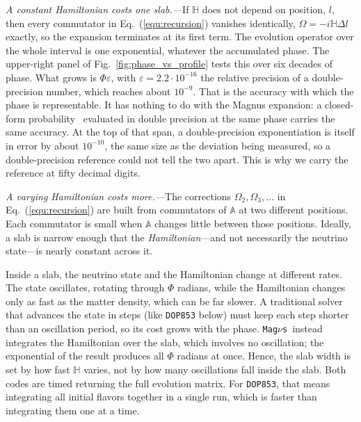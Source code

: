 \documentclass[final,5p,times,twocolumn,sort,compress]{elsarticle}
\makeatletter
\newcommand{\eq}{Eq.}
\newcommand{\fig}{Fig.}
\DeclareRobustCommand{\_}{%
  \ifmmode\nfss@text{\textunderscore}\else\textunderscore\allowbreak\fi}
\newcommand{\equ}[1]{\eq~(\ref{equ:#1})}
\newcommand{\figu}[1]{\fig~\ref{fig:#1}}
\newcommand{\magnus}{{\tt Mag}\ensuremath{\nu}{\tt s}}
\makeatother
\begin{document}
\smallskip

\textit{A constant Hamiltonian costs one slab.---}If $\mathbb{H}$ does not depend on position, $l$, then every commutator in \equ{recursion} vanishes identically, $\Omega = -i\mathbb{H}\Delta l$ exactly, so the expansion terminates at its first term. The evolution operator over the whole interval is one exponential, whatever the accumulated phase. The upper-right panel of \figu{phase_vs_profile} tests this over six decades of phase. What grows is $\Phi\varepsilon$, with $\varepsilon = 2.2 \cdot 10^{-16}$ the relative precision of a double-precision number, which reaches about $10^{-9}$. That is the accuracy with which the phase is representable. It has nothing to do with the Magnus expansion: a closed-form probability~\cite{Bustamante:2019ggq} evaluated in double precision at the same phase carries the same accuracy. At the top of that span, a double-precision exponentiation is itself in error by about $10^{-10}$, the same size as the deviation being measured, so a double-precision reference could not tell the two apart. This is why we carry the reference at fifty decimal digits.

\smallskip

\textit{A varying Hamiltonian costs more.---}The corrections $\Omega_2, \Omega_3, \ldots$ in \equ{recursion} are built from commutators of $\mathbb{A}$ at two different positions. Each commutator is small when $\mathbb{A}$ changes little between those positions. Ideally, a slab is narrow enough that the \emph{Hamiltonian}---and not necessarily the neutrino state---is nearly constant across it.

Inside a slab, the neutrino state and the Hamiltonian change at different rates. The state oscillates, rotating through $\Phi$ radians, while the Hamiltonian changes only as fast as the matter density, which can be far slower. A traditional solver that advances the state in steps (like {\tt DOP853} below) must keep each step shorter than an oscillation period, so its cost grows with the phase. \magnus\ instead integrates the Hamiltonian over the slab, which involves no oscillation; the exponential of the result produces all $\Phi$ radians at once. Hence, the slab width is set by how fast $\mathbb{H}$ varies, not by how many oscillations fall inside the slab. Both codes are timed returning the full evolution matrix. For {\tt DOP853}, that means integrating all initial flavors together in a single run, which is faster than integrating them one at a time.
\end{document}
